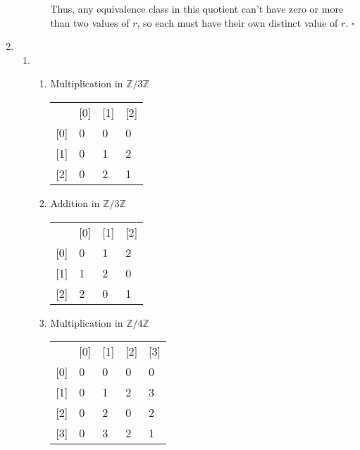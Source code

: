 \documentclass[12pt]{article}
\begin{document}
\begin{enumerate}
\begin{enumerate}
\begin{enumerate}
                            Thus, any equivalence class in this quotient can't have zero or more than two values of $r$, so each must have their own distinct value of $r$. $\square$
                  \end{enumerate}
        \end{enumerate}

        \item \begin{enumerate}
                  \item \begin{enumerate}
                            \item Multiplication in $\mathbb{Z}/3\mathbb{Z}$ \\
                            \begin{tabular}{llll}
                                & {[}0{]} & {[}1{]} & {[}2{]} \\
                                {[}0{]} & 0       & 0       & 0       \\
                                {[}1{]} & 0       & 1       & 2       \\
                                {[}2{]} & 0       & 2       & 1
                            \end{tabular}
                            \item Addition in $\mathbb{Z}/3\mathbb{Z}$ \\
                            \begin{tabular}{llll}
                                & {[}0{]} & {[}1{]} & {[}2{]} \\
                                {[}0{]} & 0       & 1       & 2      \\
                                {[}1{]} & 1       & 2       & 0       \\
                                {[}2{]} & 2       & 0       & 1
                            \end{tabular}
                            \item Multiplication in $\mathbb{Z}/4\mathbb{Z}$ \\
                            \begin{tabular}{lllll}
                                & {[}0{]} & {[}1{]} & {[}2{]} & {[}3{]} \\
                                {[}0{]} & 0       & 0       & 0    & 0  \\
                                {[}1{]} & 0       & 1       & 2    & 3   \\
                                {[}2{]} & 0       & 2       & 0    & 2   \\
                                {[}3{]} & 0       & 3       & 2    & 1   \\
                            \end{tabular}
                  \end{enumerate}


\end{enumerate}
\end{enumerate}
\end{document}

